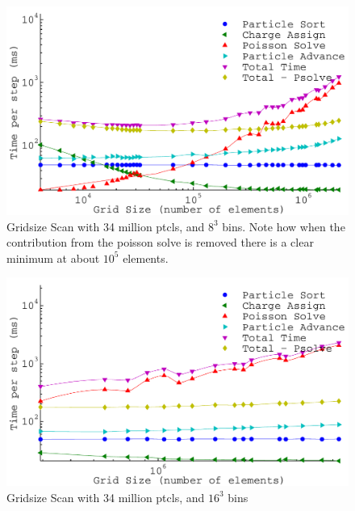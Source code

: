 \begin{figure}
\begin{center}
\includegraphics[width=6in]{performance/gridsize_scan34ptcls8bins.pdf}
\end{center}
\caption{Gridsize Scan with 34 million ptcls, and $8^3$ bins. Note how when the contribution from the poisson solve is removed there is a clear minimum at about $10^5$ elements. }
\label{fig:grid_scan34ptcls8bins}
\end{figure}

\begin{figure}
\begin{center}
\includegraphics[width=6in]{performance/gridsize_scan34ptcls16bins.pdf}
\end{center}
\caption{Gridsize Scan with 34 million ptcls, and $16^3$ bins}
\label{fig:grid_scan34ptcls16bins}
\end{figure}

